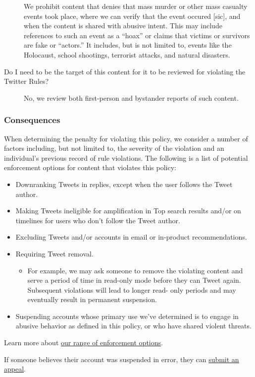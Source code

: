 \begin{description}
    We prohibit content that denies that mass murder or other mass casualty
    events took place, where we can verify that the event occured [sic], and
    when the content is shared with abusive intent. This may include references
    to such an event as a ``hoax'' or claims that victims or survivors are fake
    or ``actors.'' It includes, but is not limited to, events like the
    Holocaust, school shootings, terrorist attacks, and natural disasters.

\item[Do I need to be the target of this content for it to be reviewed for
    violating the Twitter Rules?] \hfill

    No, we review both first-person and bystander reports of such content.
\end{description}


\subsubsection{Consequences}

When determining the penalty for violating this policy, we consider a number of
factors including, but not limited to, the severity of the violation and an
individual's previous record of rule violations. The following is a list of
potential enforcement options for content that violates this policy:

\begin{itemize}
\item Downranking Tweets in replies, except when the user follows the Tweet
    author.
\item Making Tweets ineligible for amplification in Top search results and/or on
    timelines for users who don't follow the Tweet author.
\item Excluding Tweets and/or accounts in email or in-product recommendations.
\item Requiring Tweet removal.
    \begin{itemize}
    \item For example, we may ask someone to remove the violating content and
        serve a period of time in read-only mode before they can Tweet again.
        Subsequent violations will lead to longer read- only periods and may
        eventually result in permanent suspension.
    \end{itemize}
\item Suspending accounts whose primary use we've determined is to engage in
    abusive behavior as defined in this policy, or who have shared violent
    threats.
\end{itemize}

Learn more about
\href{https://web.archive.org/web/20220905021323/https://help.twitter.com/en/rules-and-policies/enforcement-options.html}{our
range of enforcement options}.

If someone believes their account was suspended in error, they can
\href{https://web.archive.org/web/20220905021323/https://help.twitter.com/forms/general?subtopic=suspended}{submit
an appeal}.

